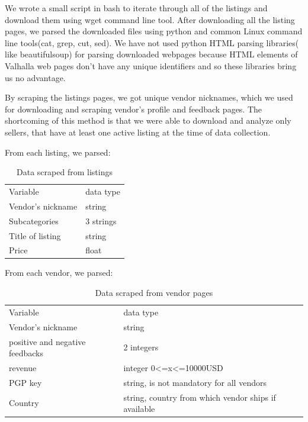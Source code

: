 \documentclass[
  digital, %
  table,   %
  lof,     %
  lot,     %
  oneside
]{fithesis3}
\begin{document}
We wrote a small script in bash to iterate through all of the listings
and download them using wget command line tool.
After downloading all the listing pages,
we parsed the downloaded files using python and common Linux command line tools(cat, grep, cut, sed).
We have not used python HTML parsing libraries( like beautifulsoup) for parsing downloaded
webpages because HTML elements of Valhalla web pages don't have any unique identifiers
and so these libraries bring us no advantage.
 
By scraping the listings pages, we got unique vendor nicknames,
which we used for downloading and scraping vendor's profile and feedback pages.
The shortcoming of this method is that we were able to download and analyze only sellers, 
that have at least one active listing at the time of data collection. 

From each listing, we parsed:

\begin{table}
    \caption{Data scraped from listings}
    \label{datalist}
    \begin{tabular}{|l|l|}
 Variable & data type\\
 Vendor's nickname & string\\
 Subcategories & 3 strings\\
 Title of listing & string\\
 Price & float\\
    \end{tabular}
\end{table}


From each vendor, we parsed:

\begin{table}
    \caption{Data scraped from vendor pages}
    \label{cryptomarkets}
    \begin{tabular}{|l|l|}
 Variable & data type\\
Vendor's nickname & string\\
positive and negative feedbacks & 2 integers\\
revenue & integer 0<=x<=10000USD\\
PGP key & string, is not mandatory for all vendors\\
Country & string, country from which vendor ships if available\\
    \end{tabular}
\end{table}
\end{document}
